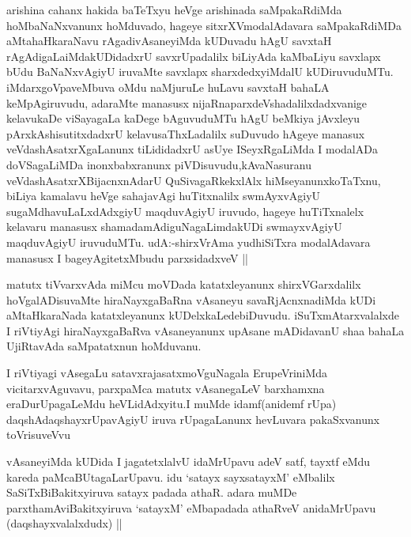\begin{center}


\end{center}

\begin{artha}
arishina cahanx hakida baTeTxyu heVge arishinada saMpakaRdiMda
hoMbaNaNxvanunx hoMduvado, hageye sitxrXVmodalAdavara saMpakaRdiMDa
aMtahaHkaraNavu rAgadivAsaneyiMda kUDuvadu hAgU savxtaH
rAgAdigaLaiMdakUDidadxrU savxrUpadalilx biLiyAda kaMbaLiyu savxlapx
bUdu BaNaNxvAgiyU iruvaMte savxlapx sharxdedxyiMdalU
kUDiruvuduMTu. iMdarxgoVpaveMbuva oMdu naMjuruLe huLavu savxtaH bahaLA
keMpAgiruvudu, adaraMte manasusx nijaRnaparxdeVshadalilxdadxvanige
kelavukaDe viSayagaLa kaDege bAguvuduMTu hAgU beMkiya jAvxleyu
pArxkAshisutitxdadxrU kelavusaThxLadalilx suDuvudo hAgeye manasux
veVdashAsatxrXgaLanunx tiLididadxrU asUye ISeyxRgaLiMda I modalADa
doVSagaLiMDa inonxbabxranunx piVDisuvudu,kAvaNasuranu
veVdashAsatxrXBijacnxnAdarU QuSivagaRkekxlAlx hiMseyanunxkoTaTxnu,
biLiya kamalavu heVge sahajavAgi huTitxnalilx swmAyxvAgiyU
sugaMdhavuLaLxdAdxgiyU maqduvAgiyU iruvudo, hageye huTiTxnalelx
kelavaru manasusx shamadamAdiguNagaLimdakUDi swmayxvAgiyU maqduvAgiyU
iruvuduMTu. udA:-shirxVrAma yudhiSiTxra modalAdavara manasusx I
bageyAgitetxMbudu parxsidadxveV ||

matutx tiVvarxvAda miMcu moVDada katatxleyanunx shirxVGarxdalilx
hoVgalADisuvaMte hiraNayxgaBaRna vAsaneyu savaRjAcnxnadiMda kUDi
aMtaHkaraNada katatxleyanunx kUDelxkaLedebiDuvudu. iSuTxmAtarxvalalxde
I riVtiyAgi hiraNayxgaBaRva vAsaneyanunx upAsane mADidavanU shaa
bahaLa UjiRtavAda saMpatatxnun hoMduvanu.
\end{artha}

\begin{artha}
I riVtiyagi vAsegaLu satavxrajasatxmoVguNagala ErupeVriniMda
vicitarxvAguvavu, parxpaMca matutx vAsanegaLeV barxhamxna
eraDurUpagaLeMdu heVLidAdxyitu.I muMde idamf(anidemf rUpa)
daqshAdaqshayxrUpavAgiyU iruva rUpagaLanunx hevLuvara pakaSxvanunx toVrisuveVvu
\end{artha}

\begin{center}


\end{center}

\begin{artha}

vAsaneyiMda kUDida I jagatetxlalvU idaMrUpavu adeV satf, tayxtf eMdu
kareda paMcaBUtagaLarUpavu. idu `satayx sayxsatayxM' eMbalilx
SaSiTxBiBakitxyiruva satayx padada athaR. adara muMDe
parxthamAviBakitxyiruva `satayxM' eMbapadada athaRveV anidaMrUpavu
(daqshayxvalalxdudx) ||
\end{artha}

